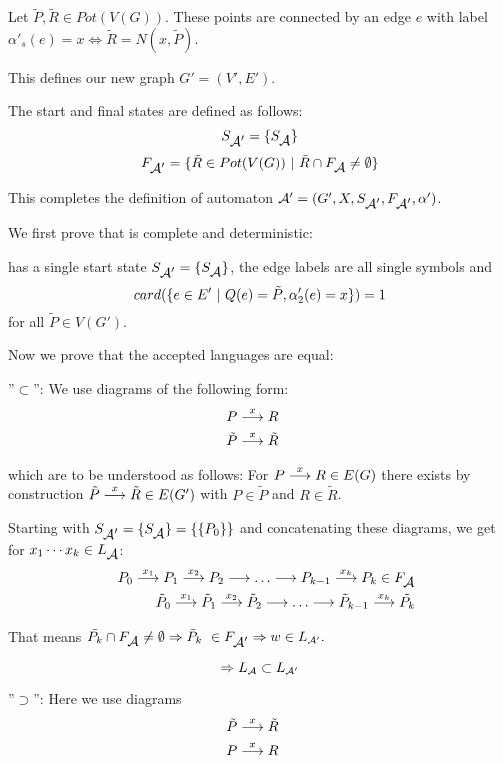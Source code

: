 Let $\tilde{P}, \tilde{R} \in Pot(V(G))$. These points are connected by an edge
$e$ with label $\alpha'_s(e) = x \Leftrightarrow \tilde{R} = N(x, \tilde{P})$.

This defines our new graph $G' = (V', E')$.

The start and final states are defined as follows:
\[ S_{\mbox{$\mathcal{A'}$}} = \{ S_{\mbox{$\mathcal{A}$}} \} \]
\[ F_{\mbox{$\mathcal{A'}$}} = \{ \tilde{R} \in Pot(V(G)) \ |\  \tilde{R} \cap
F_{\mbox{$\mathcal{A}$}} \neq \emptyset \} \]

This completes the definition of automaton $\mbox{$\mathcal{A'}$} = (G', X,
S_{\mbox{$\mathcal{A'}$}}, F_{\mbox{$\mathcal{A'}$}}, \alpha')$.

We first prove that
 is complete and deterministic:

 has a single start state $S_{\mbox{$\mathcal{A'}$}} = \{ S_{\mbox{$\mathcal{A}$}}
\}$, the edge labels are all single symbols and 
\[ card(\{ e \in E' \ |\  Q(e) = \tilde{P}, \alpha'_2(e) = x \}) = 1 \]
for all $\tilde{P} \in V(G')$.

Now we prove that the accepted languages are equal:

''$\subset$'': We use diagrams of the following form:
\begin{eqnarray*}
& P \stackrel{x}{\longrightarrow} R & \\
& \tilde{P} \stackrel{x}{\longrightarrow} \tilde{R} &
\end{eqnarray*}

which are to be understood as follows: For $P \stackrel{x}{\longrightarrow} R \in E(G)$
there exists by construction $\tilde{P} \stackrel{x}{\longrightarrow} \tilde{R} \in
E(G')$ with $P \in \tilde{P}$ and $R \in \tilde{R}$.

Starting with $S_{\mbox{$\mathcal{A'}$}} = \{ S_{\mbox{$\mathcal{A}$}} \} = \{ \{ P_0 \} \}$ and
concatenating these diagrams, we get for $x_1 \cdots x_k \in
L_{\mbox{$\mathcal{A}$}}$:
\begin{eqnarray*}
 & & P_0 \stackrel{x_1}{\longrightarrow} P_1 \stackrel{x_2}{\longrightarrow} P_2 \stackrel{}{\longrightarrow} \ldots \stackrel{}{\longrightarrow} P_{k-1} \stackrel{x_k}{\longrightarrow}
 P_k \in F_{\mbox{$\mathcal{A}$}} \\
 & & \tilde{P}_0 \stackrel{x_1}{\longrightarrow} \tilde{P}_1 \stackrel{x_2}{\longrightarrow} \tilde{P}_2 \stackrel{}{\longrightarrow} \ldots
 \stackrel{}{\longrightarrow} \tilde{P}_{k-1} \stackrel{x_k}{\longrightarrow} \tilde{P_k}
\end{eqnarray*}

That means $\tilde{P_k} \cap F_{\mbox{$\mathcal{A}$}} \neq \emptyset \Rightarrow \tilde{P}_k \
\in F_{\mbox{$\mathcal{A'}$}} \Rightarrow w \in \mbox{$L_{\mathcal{A'}}$}.$

\[ \Rightarrow \mbox{$L_{\mathcal{A}}$} \subset \mbox{$L_{\mathcal{A'}}$}\]

''$\supset$'': Here we use diagrams  
\begin{eqnarray*}
& \tilde{P} \stackrel{x}{\longrightarrow} \tilde{R} & \\
& P \stackrel{x}{\longrightarrow} R & 
\end{eqnarray*}

